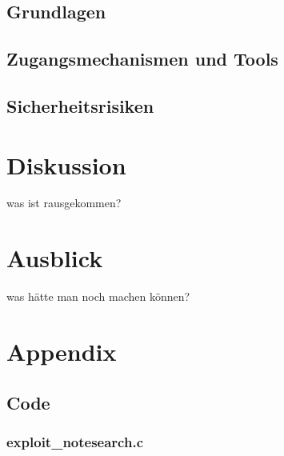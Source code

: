 \documentclass[11pt, a4paper]{article}
\begin{document}
\subsection{Grundlagen}

\subsection{Zugangsmechanismen und Tools}

\subsection{Sicherheitsrisiken}

\section{Diskussion}
was ist rausgekommen?

\section{Ausblick}
was hätte man noch machen können?


\appendix
\newpage
\renewcommand{\thesubsection}{\Alph{subsection}}
\pagebreak

\section{Appendix}
\subsection{Code}
\subsubsection{exploit\_notesearch.c}
\label{exploit_notesearch.c}




\newpage
\printbibliography
\listoffigures
\listoftables
\printglossaries
\end{document}

